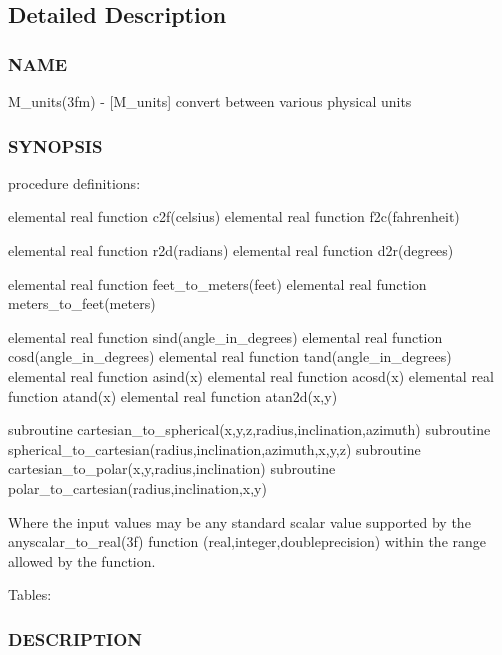 \subsection{Detailed Description}
\subsubsection*{N\+A\+ME}

M\+\_\+units(3fm) -\/ \mbox{[}M\+\_\+units\mbox{]} convert between various physical units 

\subsubsection*{S\+Y\+N\+O\+P\+S\+IS}

\begin{DoxyVerb}procedure definitions:

   elemental real function c2f(celsius)
   elemental real function f2c(fahrenheit)

   elemental real function r2d(radians)
   elemental real function d2r(degrees)

   elemental real function feet_to_meters(feet)
   elemental real function meters_to_feet(meters)

   elemental real function sind(angle_in_degrees)
   elemental real function cosd(angle_in_degrees)
   elemental real function tand(angle_in_degrees)
   elemental real function asind(x)
   elemental real function acosd(x)
   elemental real function atand(x)
   elemental real function atan2d(x,y)

   subroutine cartesian_to_spherical(x,y,z,radius,inclination,azimuth)
   subroutine spherical_to_cartesian(radius,inclination,azimuth,x,y,z)
   subroutine cartesian_to_polar(x,y,radius,inclination)
   subroutine polar_to_cartesian(radius,inclination,x,y)

Where the input values may be any standard scalar value supported by
the anyscalar_to_real(3f) function (real,integer,doubleprecision) within
the range allowed by the function.

Tables:
\end{DoxyVerb}


\subsubsection*{D\+E\+S\+C\+R\+I\+P\+T\+I\+ON}

